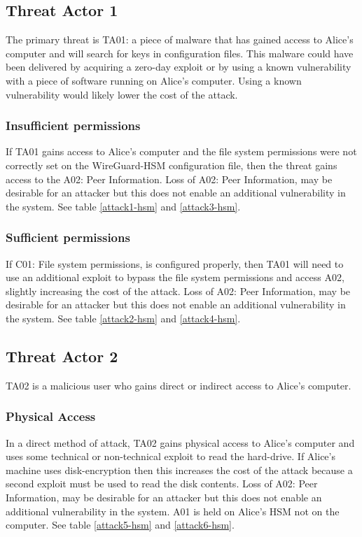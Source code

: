 \documentclass [11pt, proquest] {uwthesis}[2020/02/24]
\begin{document}
\subsection{Threat Actor 1}
The primary threat is TA01: a piece of malware that has gained access to Alice's computer and will search for keys in configuration files. This malware could have been delivered by acquiring a zero-day exploit or by using a known vulnerability with a piece of software running on Alice's computer. Using a known vulnerability would likely lower the cost of the attack.

\subsubsection{Insufficient permissions}
If TA01 gains access to Alice's computer and the file system permissions were not correctly set on the WireGuard-HSM configuration file, then the threat gains access to the A02: Peer Information. Loss of A02: Peer Information, may be desirable for an attacker but this does not enable an additional vulnerability in the system.
See table \ref{attack1-hsm} and \ref{attack3-hsm}.

\subsubsection{Sufficient permissions}
If C01: File system permissions, is configured properly, then TA01 will need to use an additional exploit to bypass the file system permissions and access A02, slightly increasing the cost of the attack. Loss of A02: Peer Information, may be desirable for an attacker but this does not enable an additional vulnerability in the system.
See table \ref{attack2-hsm} and \ref{attack4-hsm}.

\subsection{Threat Actor 2}
TA02 is a malicious user who gains direct or indirect access to Alice's computer. 

\subsubsection{Physical Access}
In a direct method of attack, TA02 gains physical access to Alice's computer and uses some technical or non-technical exploit to read the hard-drive. If Alice's machine uses disk-encryption then this increases the cost of the attack because a second exploit must be used to read the disk contents.
Loss of A02: Peer Information, may be desirable for an attacker but this does not enable an additional vulnerability in the system.
A01 is held on Alice's HSM not on the computer.
See table \ref{attack5-hsm} and \ref{attack6-hsm}.
\end{document}
